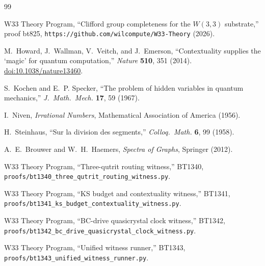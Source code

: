 \documentclass[prl,twocolumn,showpacs,superscriptaddress,longbibliography]{revtex4-2}
\begin{document}
\begin{thebibliography}{99}

W33 Theory Program,
``Clifford group completeness for the $W(3,3)$ substrate,'' proof bt825,
\texttt{https://github.com/wilcompute/W33-Theory} (2026).

M.~Howard, J.~Wallman, V.~Veitch, and J.~Emerson,
``Contextuality supplies the `magic' for quantum computation,''
\textit{Nature} \textbf{510}, 351 (2014).
\href{https://doi.org/10.1038/nature13460}{doi:10.1038/nature13460}.

S.~Kochen and E.~P. Specker,
``The problem of hidden variables in quantum mechanics,''
\textit{J.\ Math.\ Mech.} \textbf{17}, 59 (1967).

I.~Niven, \textit{Irrational Numbers},
Mathematical Association of America (1956).

H.~Steinhaus,
``Sur la division des segments,''
\textit{Colloq.\ Math.} \textbf{6}, 99 (1958).

A.~E.~Brouwer and W.~H.~Haemers,
\textit{Spectra of Graphs}, Springer (2012).

W33 Theory Program,
``Three-qutrit routing witness,'' BT1340,
\texttt{proofs/bt1340\_three\_qutrit\_routing\_witness.py}.

W33 Theory Program,
``KS budget and contextuality witness,'' BT1341,
\texttt{proofs/bt1341\_ks\_budget\_contextuality\_witness.py}.

W33 Theory Program,
``BC-drive quasicrystal clock witness,'' BT1342,
\texttt{proofs/bt1342\_bc\_drive\_quasicrystal\_clock\_witness.py}.

W33 Theory Program,
``Unified witness runner,'' BT1343,
\texttt{proofs/bt1343\_unified\_witness\_runner.py}.

\end{thebibliography}
\end{document}

